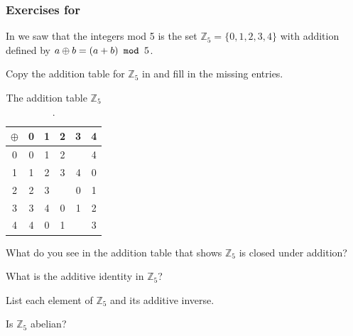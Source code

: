 
\subsubsection*{Exercises for 
\subgroups}

\begin{exer}[\exerP] %
\label{exer_Z5_add_group} 
    In  we saw that the integers mod 5 is the set $\mathbb{Z}_5 =\{0,1,2,3,4\}$ with addition defined by $a \oplus b = (a+b) \texttt{ mod } 5$.  
        \begin{exerpart}
            \item Copy the addition table for $\mathbb{Z}_5$ in  and fill in the missing entries.
                \begin{table}[hbtp]
                    \centering
                    \begin{tabular}{c|ccccc} 
                        $\oplus$ & 0 & 1 & 2 & 3 & 4 \\ \hline
                        0 & 0 & 1 & 2 &  & 4 \\
                        1 & 1 & 2 & 3 & 4 & 0 \\
                        2 & 2 & 3 &  & 0 & 1 \\
                        3 & 3 & 4 & 0 & 1 & 2 \\
                        4 & 4 & 0 & 1 &  & 3 
                    \end{tabular}
                    \caption{The addition table  $\mathbb{Z}_5$.}
                    \label{tab_add_mod5}
                \end{table}
            \item What do you see in the addition table that shows $\mathbb{Z}_5$ is closed under addition?
            \item What is the additive identity in $\mathbb{Z}_5$?
            \item List each element of $\mathbb{Z}_5$ and its additive inverse.
            \item Is $\mathbb{Z}_5$ abelian?
        \end{exerpart}
\end{exer}


